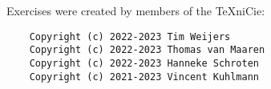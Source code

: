 \documentclass[a4paper]{article}
\begin{document}





Exercises were created by members of the TeXniCie:
\begin{verbatim}
    Copyright (c) 2022-2023 Tim Weijers
    Copyright (c) 2022-2023 Thomas van Maaren
    Copyright (c) 2022-2023 Hanneke Schroten
    Copyright (c) 2021-2023 Vincent Kuhlmann
\end{verbatim}
\end{document}
